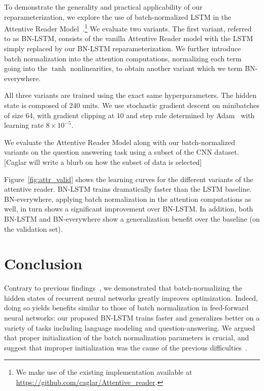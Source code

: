 \documentclass{article} %
\begin{document}
To demonstrate the generality and practical applicability of our reparameterization,
we explore the use of batch-normalized LSTM in the Attentive Reader Model~\cite{attentivereader}.\footnote{We make use of the existing implementation available at \url{https://github.com/caglar/Attentive_reader}.}
We evaluate two variants.
The first variant, referred to as BN-LSTM, consists of the vanilla Attentive Reader model with the LSTM simply replaced by our BN-LSTM reparameterization.
We further introduce batch normalization into the attention computations, normalizing each term going into the $\tanh$ nonlinearities, to obtain another variant which we term BN-everywhere.

All three variants are trained using the exact same hyperparameters.
The hidden state is composed of 240 units.
We use stochastic gradient descent on minibatches of size 64,
with gradient clipping at 10 and step rule determined by Adam~\cite{kingma2014adam}
with learning rate $8 \times 10^{-5}$.

We evaluate the Attentive Reader Model along with our batch-normalized variants on the question answering task
using a subset of the CNN dataset.
[Caglar will write a blurb on how the subset of data is selected]

Figure~\ref{fig:attr_valid} shows the learning curves for the different variants of the attentive reader.
BN-LSTM trains dramatically faster than the LSTM baseline.
BN-everywhere, applying batch normalization in the attention computations as well, in turn shows a significant
improvement over BN-LSTM.
In addition, both BN-LSTM and BN-everywhere show a generalization benefit over the baseline (on the validation set).

\section{Conclusion}

Contrary to previous findings~\cite{cesar,baidu},
we demonstrated that batch-normalizing the hidden states of recurrent neural networks greatly improves optimization.
Indeed, doing so yields benefits similar to those of batch normalization in feed-forward neural networks:
our proposed BN-LSTM trains faster and generalizes better on a variety of tasks including language modeling and question-answering.
We argued that proper initialization of the batch normalization parameters is crucial,
and suggest that improper initialization was the cause of the previous difficulties~\cite{cesar, baidu}.
\end{document}
